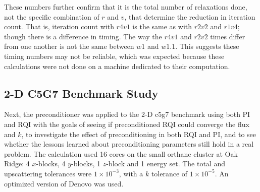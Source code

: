 These numbers further confirm that it is the total number of relaxations done, not the specific combination of $r$ and $v$, that determine the reduction in iteration count. That is, iteration count with $r4v1$ is the same as with $r2v2$ and $r1v4$; though there is a difference in timing. The way the $r4v1$ and $r2v2$ times differ from one another is not the same between $w1$ and $w1.1$. This suggests these timing numbers may not be reliable, which was expected because these calculations were not done on a machine dedicated to their computation.

\subsection{2-D C5G7 Benchmark Study}
Next, the preconditioner was applied to the 2-D c5g7 benchmark using both PI and RQI with the goals of seeing if preconditioned RQI could converge the flux and $k$, to investigate the effect of preconditioning in both RQI and PI, and to see whether the lessons learned about preconditioning parameters still hold in a real problem. The calculation used 16 cores on the small orthanc cluster at Oak Ridge: 4 $x$-blocks, 4 $y$-blocks, 1 $z$-block and 1 energy set. The total and upscattering tolerances were $1 \times 10^{-3}$, with a $k$ tolerance of $1 \times 10^{-5}$. An optimized version of Denovo was used.  

